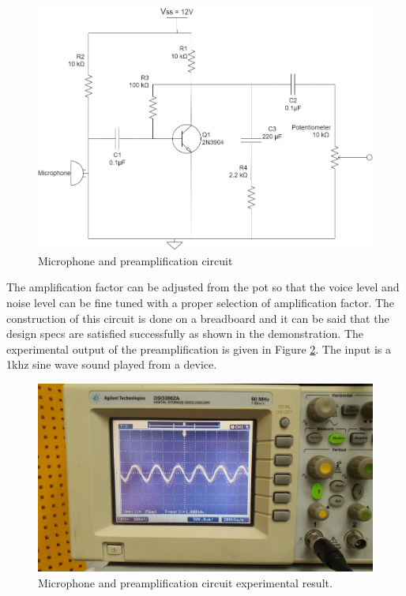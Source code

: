 \documentclass[a4paper,10pt]{IEEEtran}
\begin{document}
\begin{figure}[htbp!]
    \centering
    \includegraphics[width = 1\linewidth]{Preamplifier.drawio.png}
    \caption{Microphone and preamplification circuit}
    \label{PreAmp}
\end{figure} 
The amplification factor can be adjusted from the pot so that the voice level and noise level can be fine tuned with a proper selection of amplification factor. The construction of this circuit is done on a breadboard and it can be said that the design specs are satisfied successfully as shown in the demonstration. The experimental output of the preamplification is given in Figure \ref{preamp_osc}. The input is a 1khz sine wave sound played from a device.
\begin{figure}[htbp!]
    \centering
    \includegraphics[width = 1\linewidth]{preamp_experimental.jpeg}
    \caption{Microphone and preamplification circuit experimental result.}
    \label{preamp_osc}
\end{figure} 
\end{document}
